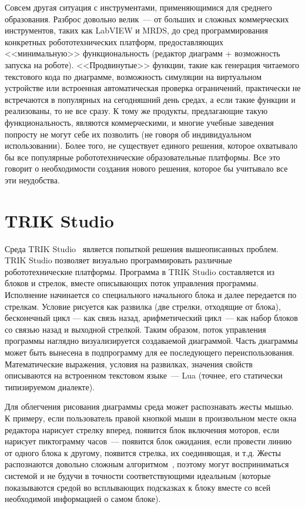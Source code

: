 \documentclass[a5paper]{article}
\begin{document}
Совсем другая ситуация с инструментами, применяющимися для среднего образования. Разброс довольно велик~--- 
от больших и сложных коммерческих инструментов, таких как LabVIEW и MRDS, до сред программирования конкретных 
робототехнических платформ, предоставляющих <<минимальную>> функциональность (редактор диаграмм + 
возможность запуска на роботе). <<Продвинутые>> функции, такие как генерация читаемого текстового 
кода по диаграмме, возможность симуляции на виртуальном устройстве или встроенная автоматическая 
проверка ограничений, практически не встречаются в популярных на сегодняшний день средах, а если такие 
функции и реализованы, то не все сразу. К тому же продукты, предлагающие такую функциональность, являются 
коммерческими, и многие учебные заведения попросту не могут себе их позволить (не говоря об индивидуальном 
использовании). Более того, не существует единого решения, которое охватывало бы все популярные 
робототехнические образовательные платформы. Все это говорит о необходимости создания нового решения, 
которое бы учитывало все эти неудобства.

\section{TRIK Studio}

Среда TRIK Studio~\cite{litvinov2015trikstudio} является попыткой решения вышеописанных проблем. 
TRIK Studio позволяет визуально программировать 
различные робототехнические платформы. Программа в TRIK Studio составляется из блоков и стрелок, вместе описывающих 
поток управления программы. Исполнение начинается со специального начального блока и далее передается по стрелкам. 
Условие рисуется как развилка (две стрелки, отходящие от блока), бесконечный цикл --- как связь назад, арифметический 
цикл~--- как набор блоков со связью назад и выходной стрелкой. Таким образом, поток управления программы наглядно 
визуализируется создаваемой диаграммой. Часть диаграммы может быть вынесена в подпрограмму для ее последующего 
переиспользования. Математические выражения, условия на развилках, значения свойств описываются на встроенном 
текстовом языке~--- Lua (точнее, его статически типизируемом диалекте).

Для облегчения рисования диаграммы среда может распознавать жесты мышью. К примеру, если пользователь правой 
кнопкой мыши в произвольном месте окна редактора нарисует стрелку вперед, появится блок включения моторов, если 
нарисует пиктограмму часов~--- появится блок ожидания, если провести линию от одного блока к другому, появится 
стрелка, их соединяющая, и т.д. Жесты распознаются довольно сложным
алгоритмом~\cite{osechkina2010gestures,osechkina2012multistroke}, поэтому могут восприниматься 
системой и не будучи в точности соответствующими идеальным (которые показываются средой во всплывающих подсказках 
к блоку вместе со всей необходимой информацией о самом блоке).
\end{document}
